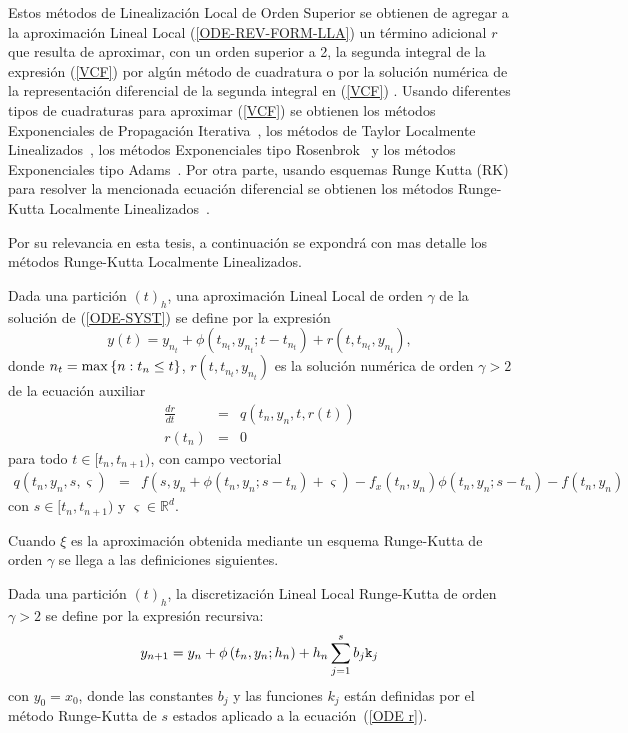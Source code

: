 Estos métodos de Linealización Local de Orden Superior se obtienen de agregar a la aproximación Lineal Local (\ref{ODE-REV-FORM-LLA}) un término adicional $r$ que resulta de aproximar, con un orden superior a 2, la segunda integral de la expresión (\ref{VCF}) por algún método de cuadratura o por la solución numérica de la representación diferencial de la segunda integral en (\ref{VCF}) \cite{delaCruz06}. Usando diferentes tipos de cuadraturas para aproximar  (\ref{VCF}) se obtienen los métodos Exponenciales de Propagación 
Iterativa~\cite{tokman2006efficient}, los métodos de Taylor Localmente Linealizados~\cite{delaCruz07}, los
métodos Exponenciales tipo Rosenbrok~\cite{hochbruck2009exponential} y los métodos Exponenciales tipo Adams~\cite{hochbruck2011exponential}. Por otra parte, usando esquemas Runge Kutta (RK) para resolver la mencionada ecuación diferencial se obtienen los métodos Runge-Kutta Localmente Linealizados~\cite{delaCruz06,Jimenez13,Jimenez14AMC}.

Por su relevancia en esta tesis, a continuación se expondrá con mas detalle los métodos Runge-Kutta Localmente Linealizados. 

Dada una partición $(t)_{h}$, una aproximación Lineal Local de orden $%
\gamma$ de la solución de (\ref{ODE-SYST}) se define por la expresión 
\begin{equation}
y(t)=y_{n_{t}}+\phi(t_{n_{t}},y_{n_{t}};t-t_{n_{t}})+r(t,t_{n_{t}},y_{n_{t}}),
\label{ODE-REV-HOLL}
\end{equation}
donde ${n_{t}=\max\left\{ n:t_{n}\leq t \right\}}$, $r(t,t_{n_{t}},y_{n_{t}})$ es la solución numérica de orden $\gamma >2$ de la ecuación auxiliar
\begin{eqnarray}
\frac{dr}{dt} & = & q(t_{n},y_{n},t,r(t))  \label{ODE r} \\
r(t_{n}) & = & 0 \nonumber
\end{eqnarray}
para todo $t\in [t_{n},t_{n+1})$, con campo vectorial 
\begin{eqnarray*}
q(t_n,y_n,s,\varsigma)&=&f(s,y_n+\phi(t_n,y_n;s-t_n)+\varsigma)-f_x(t_n,y_n)\phi(t_n,y_n;s-t_n)-f(t_n,y_n)%
\end{eqnarray*}
con $s\in [t_{n},t_{n+1})$ y $\varsigma \in \mathbb{R}^d $. 

Cuando $\xi$ es la aproximación obtenida mediante un esquema Runge-Kutta de orden $\gamma$ se llega a las definiciones siguientes.
\begin{definition}
	\label{definition HLLD} \cite{Jimenez13} Dada una partición $(t)_{h}$, la discretización Lineal Local Runge-Kutta 
    de orden $\gamma >2$ se define por la expresión recursiva:
	\begin{equation*}
	y_{n+1}=y_{n}+\phi \left( t_{n},y_{n};h_{n}\right) +h_{n}\sum_{j=1}^{s}b_{j}\mathtt{k}_{j}
	\end{equation*}%
	con $y_{0}=x_{0}$, donde las constantes $b_{j}$ y las funciones $k_{j}$ están definidas por el método Runge-Kutta de $s$ estados aplicado a la ecuación~(\ref{ODE r}).
\end{definition}

